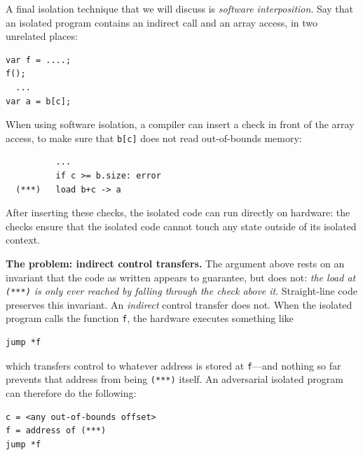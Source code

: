 \documentclass[
  letterpaper,
]{scrbook}
\theoremstyle{definition}
\theoremstyle{plain}
\theoremstyle{plain}
\theoremstyle{remark}
\begin{document}
A final isolation technique that we will discuss is \emph{software
interposition}. Say that an isolated program contains an indirect call
and an array access, in two unrelated places:

\begin{verbatim}
var f = ....;
f();
  ...
var a = b[c];
\end{verbatim}

When using software isolation, a compiler can insert a check in front of
the array access, to make sure that \texttt{b{[}c{]}} does not read
out-of-bounds memory:


\begin{verbatim}
          ...
          if c >= b.size: error
  (***)   load b+c -> a
\end{verbatim}

After inserting these checks, the isolated code can run directly on
hardware: the checks ensure that the isolated code cannot touch any
state outside of its isolated context.

\textbf{The problem: indirect control transfers.} The argument above
rests on an invariant that the code as written appears to guarantee, but
does not: \emph{the load at \texttt{(***)} is only ever reached by
falling through the check above it}. Straight-line code preserves this
invariant. An \emph{indirect} control transfer does not. When the
isolated program calls the function \texttt{f}, the hardware executes
something like

\begin{verbatim}
jump *f
\end{verbatim}

which transfers control to whatever address is stored at
\texttt{f}---and nothing so far prevents that address from being
\texttt{(***)} itself. An adversarial isolated program can therefore do
the following:

\begin{verbatim}
c = <any out-of-bounds offset>
f = address of (***)
jump *f
\end{verbatim}
\end{document}
